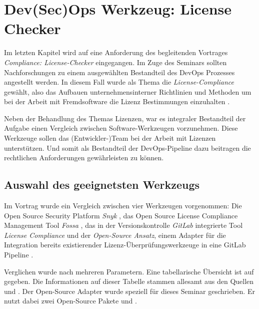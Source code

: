 \chapter{Dev(Sec)Ops Werkzeug: License Checker} \label{chapter:license-checker}

Im letzten Kapitel wird auf eine Anforderung des begleitenden Vortrages \emph{Compliance: License-Checker} eingegangen. 
Im Zuge des Seminars sollten Nachforschungen zu einem ausgewählten Bestandteil des DevOps Prozesses angestellt werden. 
In diesem Fall wurde als Thema die \emph{License-Compliance} gewählt, also das Aufbauen unternehmensinterner Richtlinien und Methoden um bei der Arbeit mit Fremdsoftware die Lizenz Bestimmungen einzuhalten \cite{validatisComplianceDefinitionBedeutung} \cite{haufe-lexwaregmbhcokgBedeutungComplianceFuer}.


\begin{sloppypar}
Neben der Behandlung des Themas Lizenzen, war es integraler Bestandteil der Aufgabe einen Vergleich zwischen Software-Werkzeugen vorzunehmen. Diese Werkzeuge sollen das \mbox{(Entwickler-)Team} bei der Arbeit mit Lizenzen unterstützen. Und somit als Bestandteil der DevOps-Pipeline dazu beitragen die rechtlichen Anforderungen gewährleisten zu können.
\end{sloppypar}

\section{Auswahl des geeignetsten Werkzeugs}

Im Vortrag wurde ein Vergleich zwischen vier Werkzeugen vorgenommen: Die \glqq Open Source Security Platform\grqq{} \emph{Snyk} \cite{snykLicensingComplianceManagement}, das \glqq Open Source License Compliance Management Tool\grqq{} \emph{Fossa} \cite{fossaOpenSourceLicense}, das in der Versionskontrolle \emph{GitLab} integrierte Tool \emph{License Compliance} \cite{gitlabLicenseComplianceGitLab} und der \emph{Open-Source Ansatz}, einem Adapter für die Integration bereits existierender Lizenz-Überprüfungs\-werkzeuge in eine GitLab Pipeline \cite{kellOpenSourceLicenseChecker2021}.

Verglichen wurde nach mehreren Parametern. Eine tabellarische Übersicht ist auf  gegeben. Die Informationen auf dieser Tabelle stammen allesamt aus den Quellen \cite{snykLicensingComplianceManagement} \cite{fossaOpenSourceLicense} und \cite{gitlabLicenseComplianceGitLab}. Der Open-Source Adapter wurde speziell für dieses Seminar geschrieben. Er nutzt dabei zwei Open-Source Pakete \cite{glassNPMLicenseChecker} und \cite{bauernfeindComposerLicenseChecker}.

